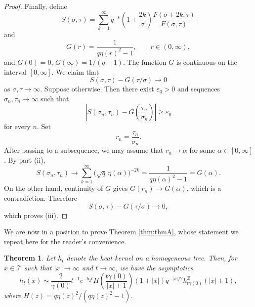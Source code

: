 \documentclass[10pt,a4paper]{amsart}
\renewcommand\mathcal{\mathscr}
\theoremstyle{plain}
\newtheorem{theorem}{Theorem}[section]
\theoremstyle{remark}
\theoremstyle{definition}
\begin{document}
\begin{proof}
Finally, define
\[
S(\sigma,\tau)
=
\sum_{k=1}^{\infty}
q^{-k}
\left(1+\frac{2k}{\sigma}\right)
\frac{F(\sigma+2k,\tau)}{F(\sigma,\tau)}
\]
and
\[
G(r)=\frac{1}{q\eta(r)^2-1},
\qquad r\in(0,\infty),
\]
and $G(0)=0$, 
$G(\infty)=1/(q-1)$. The function $G$ is continuous on the interval
$[0,\infty]$. We claim that
\[
S(\sigma,\tau)-G(\tau/\sigma)\to 0
\]
as $\sigma,\tau\to\infty$. Suppose otherwise. Then there exist
$\varepsilon_0>0$ and sequences $\sigma_n,\tau_n\to\infty$ such that
\[
\left|
S(\sigma_n,\tau_n)
-
G\left(\frac{\tau_n}{\sigma_n}\right)
\right|
\geq\varepsilon_0
\]
for every $n$. Set
\[
r_n=\frac{\tau_n}{\sigma_n}.
\]
After passing to a subsequence, we may assume that $r_n\to \alpha$
for some $\alpha\in[0,\infty]$. By part \rm(ii),
\[
S(\sigma_n,\tau_n)
\to 
\sum_{k=1}^{\infty}
\bigl(\sqrt q\,\eta(\alpha)\bigr)^{-2k}
=
\frac{1}{q\eta(\alpha)^2-1}
=
G(\alpha).
\]
On the other hand, continuity of $G$ gives $
G(r_n)\to  G(\alpha)$,
which is a contradiction. Therefore
\[
S(\sigma,\tau)-G(\tau/\sigma)\to 0,
\]
which proves \rm(iii).
\end{proof}

We are now in a position to prove Theorem \ref{thm:thmA}, whose statement we repeat here for the reader's convenience. 



\begin{theorem}\label{prop:heat_asymp_ell1}
		Let $h_t$ denote the heat kernel on a homogeneous tree. Then, for $x\in \mathcal{T}$ such that $|x|\to \infty$ and $t\to \infty$, we have the asymptotics
		\[
		h_t(x)\sim\frac{2}{\gamma(0)}
t^{-1}e^{-b_2t}
H\!\left(\frac{t\gamma(0)}{|x|+1}\right)
(1+|x|)q^{-|x|/2}
h_{t\gamma(0)}^{\mathbb Z}(|x|+1),\]
where $H(z)={q\eta(z)^2}/{(q\eta(z)^2-1)}$.
	\end{theorem}
\end{document}
